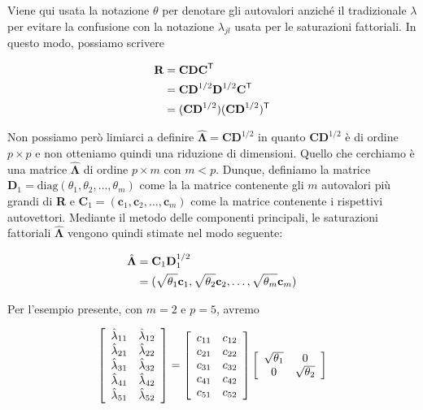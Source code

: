 \documentclass[
  11pt,
]{krantz}
\theoremstyle{definition}
\theoremstyle{definition}
\theoremstyle{definition}
\theoremstyle{definition}
\theoremstyle{remark}
\begin{document}
Viene qui usata la notazione \(\theta\) per denotare gli autovalori anziché il tradizionale \(\lambda\) per evitare la confusione con la notazione \(\lambda_{jl}\) usata per le saturazioni fattoriali. In questo modo, possiamo scrivere

\begin{equation}
\begin{aligned}
\textbf{R} &= \textbf{C}\textbf{D}\textbf{C}^{\mathsf{T}}\notag\\
&= \textbf{C}\textbf{D}^{1/2}\textbf{D}^{1/2}\textbf{C}^{\mathsf{T}}\notag\\
&= (\textbf{C}\textbf{D}^{1/2}) (\textbf{C}\textbf{D}^{1/2})^{\mathsf{T}}
\end{aligned}
\end{equation}

Non possiamo però limiarci a definire \(\hat{\boldsymbol{\Lambda}}=\textbf{C}\textbf{D}^{1/2}\) in quanto \(\textbf{C}\textbf{D}^{1/2}\) è di ordine \(p \times p\) e non otteniamo quindi una riduzione di dimensioni. Quello che cerchiamo è una matrice \(\hat{\boldsymbol{\Lambda}}\) di ordine \(p \times m\) con \(m < p\). Dunque, definiamo la matrice \(\textbf{D}_1= \text{diag}(\theta_1, \theta_2, \dots, \theta_m)\) come la la matrice contenente gli \(m\) autovalori più grandi di \textbf{R} e \(\textbf{C}_1=( \textbf{c}_1, \textbf{c}_2, \dots, \textbf{c}_m)\) come la matrice contenente i rispettivi autovettori. Mediante il metodo delle componenti principali, le saturazioni fattoriali \(\hat{\boldsymbol{\Lambda}}\) vengono quindi stimate nel modo seguente:

\begin{equation}
\begin{aligned}
\hat{\boldsymbol{\Lambda}} &= \textbf{C}_1 \textbf{D}_1^{1/2}\notag\\
&= (\sqrt{\theta_1} \textbf{c}_1, \sqrt{\theta_2} \textbf{c}_2, 
\dots, \sqrt{\theta_m} \textbf{c}_m) 
\end{aligned}
\end{equation}

Per l'esempio presente, con \(m=2\) e \(p=5\), avremo

\[
\left[
  \begin{array}{ c c }
 \hat{\lambda}_{11} & \hat{\lambda}_{12} \\
 \hat{\lambda}_{21} & \hat{\lambda}_{22} \\
 \hat{\lambda}_{31} & \hat{\lambda}_{32} \\
 \hat{\lambda}_{41} & \hat{\lambda}_{42} \\
 \hat{\lambda}_{51} & \hat{\lambda}_{52} 
  \end{array} 
\right] =
\left[
  \begin{array}{ c c }
 c_{11} & c_{12} \\
 c_{21} & c_{22} \\
 c_{31} & c_{32} \\
 c_{41} & c_{42} \\
 c_{51} & c_{52} 
  \end{array} 
\right]
\left[
  \begin{array}{ c c }
 \sqrt{\theta_1} & 0\\
 0 &\sqrt{\theta_2} 
  \end{array} 
\right]
\]
\end{document}
